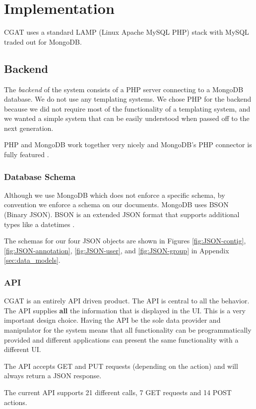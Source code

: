 \documentclass[10pt, conference, compsocconf]{IEEEtran}
\begin{document}
\section{Implementation}\label{sec:implementation}
CGAT uses a standard LAMP (Linux Apache MySQL PHP) stack with MySQL traded out for MongoDB.

\subsection{Backend}
The \textit{backend} of the system consists of a PHP server connecting to a MongoDB database.
We do not use any templating systems.
We chose PHP for the backend because we did not require most of the functionality of a templating system, and we wanted a simple
system that can be easily understood when passed off to the next generation.

PHP and MongoDB work together very nicely and MongoDB's PHP connector is fully featured \cite{phpMongo}.

\subsubsection{Database Schema}
Although we use MongoDB which does not enforce a specific schema, by convention we enforce a schema on our documents.
MongoDB uses BSON (Binary JSON). BSON is an extended JSON format that supports additional types like a datetimes \cite{bson}.

The schemas for our four JSON objects are shown in Figures \ref{fig:JSON-contig}, \ref{fig:JSON-annotation},
\ref{fig:JSON-user}, and \ref{fig:JSON-group} in Appendix \ref{sec:data_models}.

\subsubsection{API}
CGAT is an entirely API driven product. The API is central to all the behavior.
The API supplies \textbf{all} the information that is displayed in the UI.
This is a very important design choice. Having the API be the sole data provider and manipulator for the system
means that all functionality can be programmatically provided and different applications can present the same
functionality with a different UI.

The API accepts GET and PUT requests (depending on the action) and will always return a JSON response.

The current API supports 21 different calls, 7 GET requests and 14 POST actions.
\end{document}
